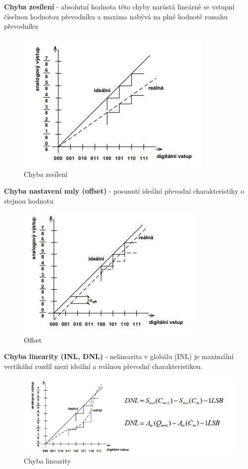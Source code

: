 \textbf{Chyba zesílení} - absolutní hodnota této chyby narůstá lineárně
se vstupní číselnou hodnotou převodníku a maxima nabývá na
plné hodnotě rozsahu převodníku
\begin{figure}[h]
   \begin{center}
     \includegraphics[scale=0.6]{images/CHzes.png}
   \end{center}
   \caption{Chyba zesílení}
\end{figure}

\textbf{Chyba nastavení nuly (offset)} - posunutí ideální převodní
charakteristiky o stejnou hodnotu
\begin{figure}[h]
   \begin{center}
     \includegraphics[scale=0.6]{images/offset.png}
   \end{center}
   \caption{Offset}
\end{figure}

\textbf{Chyba linearity (INL, DNL)} - nelinearita v globálu (INL) je
maximální vertikální rozdíl mezi ideální a reálnou převodní
charakteristikou.
\begin{figure}[h]
   \begin{center}
     \includegraphics[scale=0.6]{images/CHlin.png}
   \end{center}
   \caption{Chyba linearity}
\end{figure}

